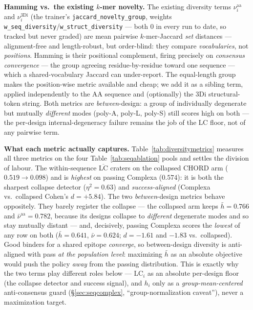 \documentclass[11pt]{article}
\newcommand{\ttk}[1]{\texttt{\small #1}}
\begin{document}
\textbf{Hamming vs.\ the existing $k$-mer novelty.} The existing diversity terms $\nu^{\mathrm{aa}}_i$ and
$\nu^{\mathrm{3Di}}_i$ (the trainer's \ttk{jaccard\_novelty\_group}, weights
\ttk{w\_seq\_diversity}/\ttk{w\_struct\_diversity} --- both $0$ in every run to date, so tracked but never
graded) are mean pairwise $k$-mer-Jaccard \emph{set} distances ---
alignment-free and length-robust, but order-blind: they compare \emph{vocabularies}, not
\emph{positions}. Hamming is their positional complement, firing precisely on \emph{consensus
convergence} --- the group agreeing residue-by-residue toward one sequence --- which a shared-vocabulary
Jaccard can under-report. The equal-length group makes the position-wise metric available and cheap; we
add it as a sibling term, applied independently to the AA sequence and (optionally) the 3Di
structural-token string. Both metrics are \emph{between}-design: a group of individually degenerate but
mutually \emph{different} modes (poly-A, poly-L, poly-S) still scores high on both --- the per-design
internal-degeneracy failure remains the job of the $\mathrm{LC}$ floor, not of any pairwise term.

\textbf{What each metric actually captures.} Table~\ref{tab:diversitymetrics} measures all three
metrics on the four Table~\ref{tab:seqablation} pools and settles the division of labour. The
within-sequence $\overline{\mathrm{LC}}$ craters on the collapsed CHORD arm ($0.519\!\to\!0.098$) and is
\emph{highest} on passing Complexa ($0.574$): it is both the sharpest collapse detector
($\eta^2{=}0.63$) and \emph{success-aligned} (Complexa vs.\ collapsed Cohen's $d{=}{+}5.84$). The two
\emph{between}-design metrics behave oppositely. They barely register the collapse --- the collapsed arm
keeps $\bar h{=}0.766$ and $\bar\nu^{\mathrm{aa}}{=}0.782$, because its designs collapse to
\emph{different} degenerate modes and so stay mutually distant --- and, decisively, passing Complexa
scores the \emph{lowest} of any row on both ($\bar h{=}0.641$, $\bar\nu{=}0.624$; $d{=}{-}1.61$ and
$-1.83$ vs.\ collapsed). Good binders for a shared epitope \emph{converge}, so between-design diversity
is anti-aligned with pass \emph{at the population level}: maximizing $\bar h$ as an absolute objective
would push the policy \emph{away} from the passing distribution. This is exactly why the two terms play
different roles below --- $\mathrm{LC}_i$ as an absolute per-design floor (the collapse detector and
success signal), and $h_i$ only as a \emph{group-mean-centered} anti-consensus guard (\S\ref{sec:seqcomplex},
``group-normalization caveat''), never a maximization target.
\end{document}
